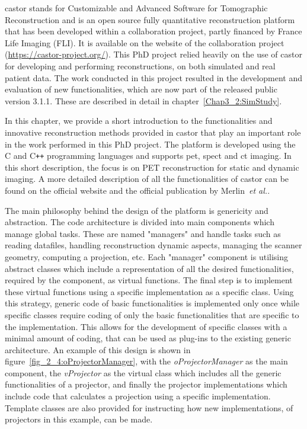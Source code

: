 \Gls{castor} stands for Customizable and Advanced Software for Tomographic Reconstruction and is an open source fully quantitative reconstruction platform that has been developed within a collaboration project, partly financed by France Life Imaging (FLI). It is available on the website of the collaboration project {(\url{https://castor-project.org/})}.
This PhD project relied heavily on the use of \gls{castor} for developing and performing reconstructions, on both simulated and real patient data. The work conducted in this project resulted in the development and evaluation of new functionalities, which are now part of the released public version 3.1.1. These are described in detail in chapter~\ref{Chap3_2:SimStudy}. 

In this chapter, we provide a short introduction to the functionalities and innovative reconstruction methods provided in \gls{castor} that play an important role in the work performed in this PhD project. 
The platform is developed using the C and C\texttt{++} programming languages and supports \gls{pet}, \gls{spect} and \gls{ct} imaging. 
In this short description, the focus is on PET reconstruction for static and dynamic imaging. A more detailed description of all the functionalities of \gls{castor} can be found on the official website and the official publication by Merlin~\textit{et al.}\cite{Merlin2018}. 

The main philosophy behind the design of the platform is genericity and abstraction. The code architecture is divided into main components which manage global tasks. These are named "managers" and handle tasks such as reading datafiles, handling reconstruction dynamic aspects, managing the scanner geometry, computing a projection, etc. 
Each "manager" component is utilising abstract classes which include a representation of all the desired functionalities, required by the component, as virtual functions. The final step is to implement these virtual functions using a specific implementation as a specific class. 
Using this strategy, generic code of basic functionalities is implemented only once while specific classes require coding of only the basic functionalities that are specific to the implementation. This allows for the development of specific classes with a minimal amount of coding, that can be used as plug-ins to the existing generic architecture. 
An example of this design is shown in figure~\ref{fig_2_4:oProjectorManager}, with the \textit{oProjectorManager} as the main component, the \textit{vProjector} as the virtual class which includes all the generic functionalities of a projector, and finally the projector implementations which include code that calculates a projection using a specific implementation. Template classes are also provided for instructing how new implementations, of projectors in this example, can be made. 

